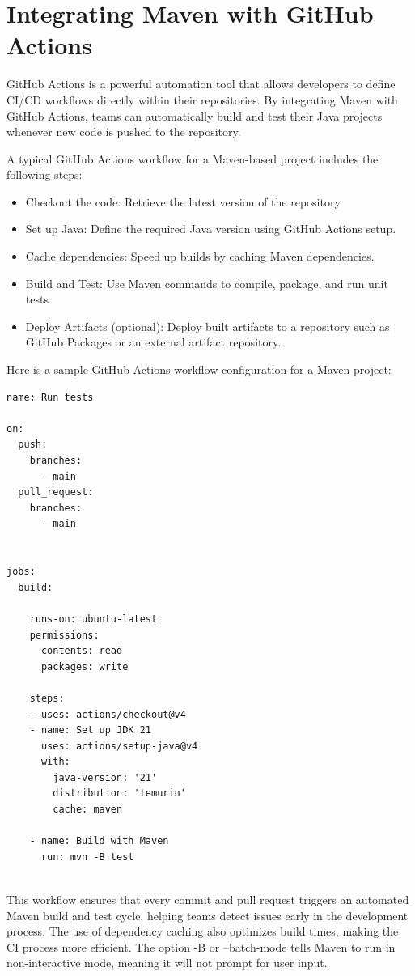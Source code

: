 \section{Integrating Maven with GitHub Actions}

GitHub Actions is a powerful automation tool that allows developers to define CI/CD workflows directly within their repositories. By integrating Maven with GitHub Actions, teams can automatically build and test their Java projects whenever new code is pushed to the repository.

A typical GitHub Actions workflow for a Maven-based project includes the following steps:
\begin{itemize}
\item Checkout the code: Retrieve the latest version of the repository.
\item Set up Java: Define the required Java version using GitHub Actions setup.
\item Cache dependencies: Speed up builds by caching Maven dependencies.
\item Build and Test: Use Maven commands to compile, package, and run unit tests.
\item Deploy Artifacts (optional): Deploy built artifacts to a repository such as GitHub Packages or an external artifact repository.
\end{itemize}

Here is a sample GitHub Actions workflow configuration for a Maven project:

\begin{lstlisting}
name: Run tests

on: 
  push:
    branches:
      - main
  pull_request:
    branches:
      - main
  

jobs:
  build:

    runs-on: ubuntu-latest
    permissions:
      contents: read
      packages: write

    steps:
    - uses: actions/checkout@v4
    - name: Set up JDK 21
      uses: actions/setup-java@v4
      with:
        java-version: '21'
        distribution: 'temurin'
        cache: maven

    - name: Build with Maven
      run: mvn -B test
      
\end{lstlisting}

This workflow ensures that every commit and pull request triggers an automated Maven build and test cycle, helping teams detect issues early in the development process. The use of dependency caching also optimizes build times, making the CI process more efficient.  The option -B or --batch-mode tells Maven to run in non-interactive mode, meaning it will not prompt for user input.

